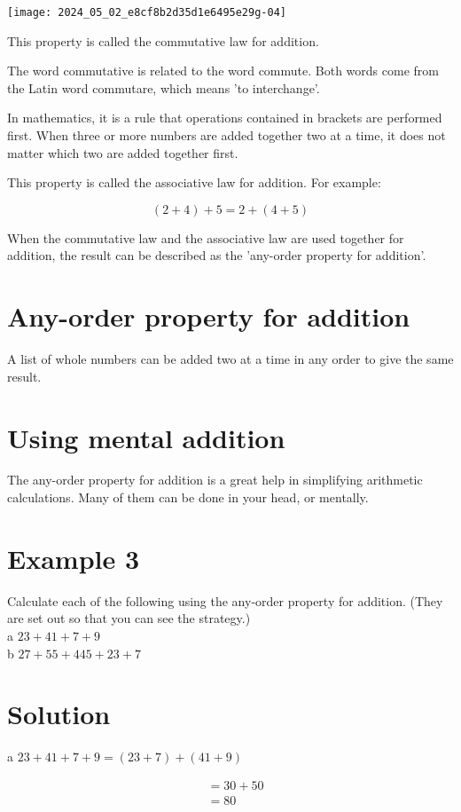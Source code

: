 \documentclass[10pt]{article}
\begin{document}
\begin{center}
\texttt{[image: 2024\_05\_02\_e8cf8b2d35d1e6495e29g-04]}
\end{center}

This property is called the commutative law for addition.

The word commutative is related to the word commute. Both words come from the Latin word commutare, which means 'to interchange'.

In mathematics, it is a rule that operations contained in brackets are performed first. When three or more numbers are added together two at a time, it does not matter which two are added together first.

This property is called the associative law for addition. For example:

\[
(2+4)+5=2+(4+5)
\]

When the commutative law and the associative law are used together for addition, the result can be described as the 'any-order property for addition'.

\section*{Any-order property for addition}
A list of whole numbers can be added two at a time in any order to give the same result.

\section*{Using mental addition}
The any-order property for addition is a great help in simplifying arithmetic calculations. Many of them can be done in your head, or mentally.

\section*{Example 3}
Calculate each of the following using the any-order property for addition. (They are set out so that you can see the strategy.)\\
a \(23+41+7+9\)\\
b \(27+55+445+23+7\)

\section*{Solution}
a \(23+41+7+9=(23+7)+(41+9)\)

\[
\begin{aligned}
& =30+50 \\
& =80
\end{aligned}
\]
\end{document}

